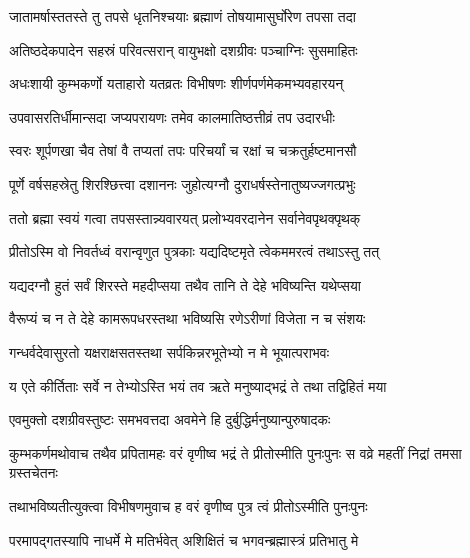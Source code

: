 \twolineshloka
{जातामर्षास्ततस्ते तु तपसे धृतनिश्चयाः}
{ब्रह्माणं तोषयामासुर्घोरेण तपसा तदा}


\twolineshloka
{अतिष्ठदेकपादेन सहस्रं परिवत्सरान्}
{वायुभक्षो दशग्रीवः पञ्चाग्निः सुसमाहितः}


\twolineshloka
{अधःशायी कुम्भकर्णो यताहारो यतव्रतः}
{विभीषणः शीर्णपर्णमेकमभ्यवहारयन्}


\twolineshloka
{उपवासरतिर्धीमान्सदा जप्यपरायणः}
{तमेव कालमातिष्ठत्तीव्रं तप उदारधीः}


\twolineshloka
{स्वरः शूर्पणखा चैव तेषां वै तप्यतां तपः}
{परिचर्यां च रक्षां च चक्रतुर्हष्टमानसौ}


\twolineshloka
{पूर्णे वर्षसहस्रेतु शिरश्छित्त्वा दशाननः}
{जुहोत्यग्नौ दुराधर्षस्तेनातुष्यज्जगत्प्रभुः}


\twolineshloka
{ततो ब्रह्मा स्वयं गत्वा तपसस्तान्न्यवारयत्}
{प्रलोभ्यवरदानेन सर्वानेवपृथक्पृथक्}



\twolineshloka
{प्रीतोऽस्मि वो निवर्तध्वं वरान्वृणुत पुत्रकाः}
{यद्यदिष्टमृते त्वेकममरत्वं तथाऽस्तु तत्}


\twolineshloka
{यद्यदग्नौ हुतं सर्वं शिरस्ते महदीप्सया}
{तथैव तानि ते देहे भविष्यन्ति यथेप्सया}


\twolineshloka
{वैरूप्यं च न ते देहे कामरूपधरस्तथा}
{भविष्यसि रणेऽरीणां विजेता न च संशयः}



\twolineshloka
{गन्धर्वदेवासुरतो यक्षराक्षसतस्तथा}
{सर्पकिन्नरभूतेभ्यो न मे भूयात्पराभवः}



\twolineshloka
{य एते कीर्तिताः सर्वे न तेभ्योऽस्ति भयं तव}
{ऋते मनुष्याद्भद्रं ते तथा तद्विहितं मया}



\twolineshloka
{एवमुक्तो दशग्रीवस्तुष्टः समभवत्तदा}
{अवमेने हि दुर्बुद्धिर्मनुष्यान्पुरुषादकः}


\threelineshloka
{कुम्भकर्णमथोवाच तथैव प्रपितामहः}
{वरं वृणीष्व भद्रं ते प्रीतोस्मीति पुनःपुनः}
{स वव्रे महतीं निद्रां तमसा ग्रस्तचेतनः}


\twolineshloka
{तथाभविष्यतीत्युक्त्वा विभीषणमुवाच ह}
{वरं वृणीष्व पुत्र त्वं प्रीतोऽस्मीति पुनःपुनः}



\twolineshloka
{परमापद्गतस्यापि नाधर्मे मे मतिर्भवेत्}
{अशिक्षितं च भगवन्ब्रह्मास्त्रं प्रतिभातु मे}




